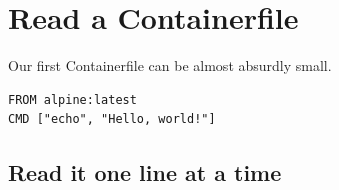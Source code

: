 \chapter{Read a Containerfile}
\label{chap:containerfile}

Our first Containerfile can be almost absurdly small.

\begin{lstlisting}
FROM alpine:latest
CMD ["echo", "Hello, world!"]
\end{lstlisting}

\section{Read it one line at a time}
